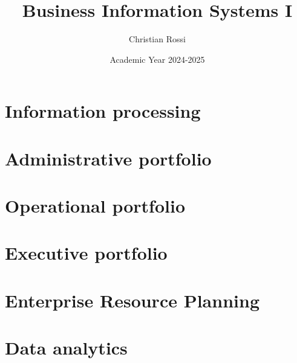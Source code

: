 \documentclass[12pt, a4paper]{report}
\title{\textbf{Business Information Systems I}}
\author{Christian Rossi}
\date{Academic Year 2024-2025}
\begin{document}
    \maketitle

    

    \cleardoublepage{}

    \tableofcontents

    \cleardoublepage{}

    \chapter{Information processing}
    
    
    
    
    

    \chapter{Administrative portfolio}
    

    \chapter{Operational portfolio}
    
    

    \chapter{Executive portfolio}

    \chapter{Enterprise Resource Planning}

    \chapter{Data analytics}
\end{document}
